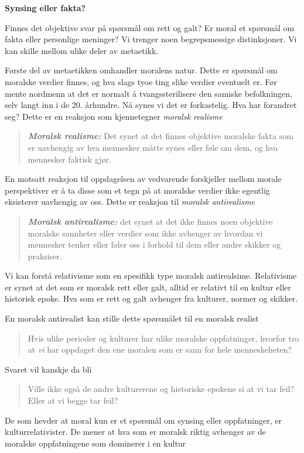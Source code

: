 \documentclass[11pt, a4paper]{article}
\newenvironment{sectionbox}[1][]{%
    \begin{sectionboxinner}
    \textbf{\large #1}
    \vspace{1pt}
    \newline
}{%
    \end{sectionboxinner}
}
\begin{document}
\begin{sectionbox}[Synsing eller fakta?]
\begin{flushleft}
    Finnes det objektive svar på spørsmål om rett og galt? Er moral et spørsmål om fakta eller personlige meninger? Vi trenger noen begrepsmessige distinksjoner. Vi kan skille mellom ulike deler av metaetikk.\newline

    Første del av metaetikken omhandler moralens natur. Dette er spørsmål om moralske verdier finnes, og hva slags tyoe ting slike verdier eventuelt er. Før mente nordmenn at det er normalt å tvangssterilisere den samiske befolkningen, selv langt inn i de 20. århundre. Nå synes vi det er forkastelig. Hva har forandret seg? Dette er en reaksjon som kjennetegner \textit{moralsk realisme}
    \begin{quote}
        \textbf{\textit{Moralsk realisme:}} Det synet at det finnes objektive moralske fakta som er uavhengig av hva mennesker måtte synes eller føle om dem, og hva mennesker faktisk gjør.
    \end{quote}

    En motsatt reaksjon til oppdagelsen av vedvarende forskjeller mellom morale perspektiver er å ta disse som et tegn på at moralske verdier ikke egentlig eksisterer uavhengig av oss. Dette er reaksjon til \textit{moralsk antirealisme}

    \begin{quote}
        \textbf{\textit{Moralsk antirealisme:}} det synet at det ikke finnes noen objektive moralske sannheter eller verdier som ikke avhenger av hvordan vi mennesker tenker eller føler oss i forhold til dem eller andre skikker og praksiser.
    \end{quote}

    Vi kan forstå relativisme som en spesifikk type moralsk antirealsime. Relativisme er synet at det som er moralsk rett eller galt, alltid er relativt til en kultur eller historisk epoke. Hva som er rett og galt avhenger fra kulturer, normer og skikker. \newline

    En moralsk antirealist kan stille dette spørsmålet til en moralsk realist
    \begin{quote}
        Hvis ulike perioder og kulturer har ulike moralske oppfatninger, hvorfor tro at \textit{vi} har oppdaget den ene moralen som er sann for hele menneskeheten?
    \end{quote}
    Svaret vil kanskje da bli
    \begin{quote}
        Ville ikke også de andre kulturerene og historiske epokene si at vi tar feil? Eller at vi begge tar feil?
    \end{quote}
    De som hevder at moral kun er et spørsmål om synsing eller oppfatninger, er kulturrelativister. De mener at hva som er moralsk riktig avhenger av de moralske oppfatningene som dominerer i en kultur\newline


\end{flushleft}
\end{sectionbox}
\end{document}
